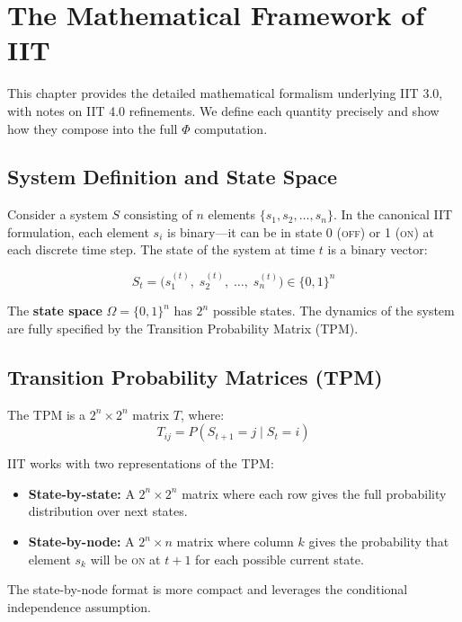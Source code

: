 \documentclass[11pt,a4paper]{report}
\newcommand{\Phi}{\varPhi}
\begin{document}
\chapter{The Mathematical Framework of IIT}

This chapter provides the detailed mathematical formalism underlying IIT 3.0, with notes on IIT 4.0 refinements. We define each quantity precisely and show how they compose into the full $\Phi$ computation.

\section{System Definition and State Space}

Consider a system $S$ consisting of $n$ elements $\{s_1, s_2, \ldots, s_n\}$. In the canonical IIT formulation, each element $s_i$ is binary---it can be in state 0 (\textsc{off}) or 1 (\textsc{on}) at each discrete time step. The state of the system at time $t$ is a binary vector:

\begin{mathbox}
\vspace{-8pt}
\[
  S_t = \bigl(s_1^{(t)},\; s_2^{(t)},\; \ldots,\; s_n^{(t)}\bigr) \in \{0, 1\}^n
\]
\vspace{-10pt}
\end{mathbox}

The \textbf{state space} $\Omega = \{0, 1\}^n$ has $2^n$ possible states. The dynamics of the system are fully specified by the Transition Probability Matrix (TPM).

\section{Transition Probability Matrices (TPM)}

The TPM is a $2^n \times 2^n$ matrix $T$, where:
\[
  T_{ij} = P(S_{t+1} = j \mid S_t = i)
\]

IIT works with two representations of the TPM:

\begin{definitionbox}
\begin{itemize}[leftmargin=1.5em]
  \item \textbf{State-by-state:} A $2^n \times 2^n$ matrix where each row gives the full probability distribution over next states.
  \item \textbf{State-by-node:} A $2^n \times n$ matrix where column $k$ gives the probability that element $s_k$ will be \textsc{on} at $t+1$ for each possible current state.
\end{itemize}
The state-by-node format is more compact and leverages the conditional independence assumption.
\end{definitionbox}
\end{document}
